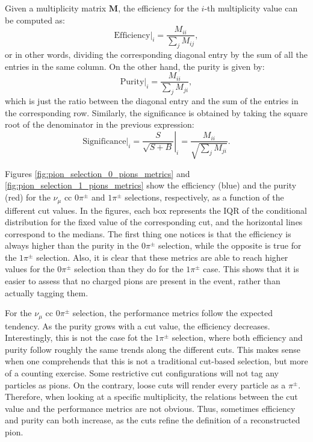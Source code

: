 Given a multiplicity matrix $\mathbf{M}$, the efficiency for the $i$-th multiplicity value can be computed as:
\begin{equation}\label{eq:efficiency_matrix}
    \left.\mathrm{Efficiency}\right|_{i} = \frac{M_{ii}}{\sum_{j} M_{ij}},
\end{equation}
or in other words, dividing the corresponding diagonal entry by the sum of all the entries in the same column. On the other hand, the purity is given by:
\begin{equation}\label{eq:purity_matrix}
    \left.\mathrm{Purity}\right|_{i} = \frac{M_{ii}}{\sum_{j} M_{ji}},
\end{equation}
which is just the ratio between the diagonal entry and the sum of the entries in the corresponding row. Similarly, the significance is obtained by taking the square root of the denominator in the previous expression:
\begin{equation}\label{eq:significance_matrix}
    \left.\mathrm{Significance}\right|_{i} = \left.\frac{S}{\sqrt{S+B}}\right|_{i} = \frac{M_{ii}}{\sqrt{\sum_{j} M_{ji}}}.
\end{equation}

Figures \ref{fig:pion_selection_0_pions_metrics} and \ref{fig:pion_selection_1_pions_metrics} show the efficiency (blue) and the purity (red) for the $\nu_{\mu}$ \gls{cc} $0\pi^{\pm}$ and $1\pi^{\pm}$ selections, respectively, as a function of the different cut values. In the figures, each box represents the IQR of the conditional distribution for the fixed value of the corresponding cut, and the horizontal lines correspond to the medians. The first thing one notices is that the efficiency is always higher than the purity in the $0\pi^{\pm}$ selection, while the opposite is true for the $1\pi^{\pm}$ selection. Also, it is clear that these metrics are able to reach higher values for the $0\pi^{\pm}$ selection than they do for the $1\pi^{\pm}$ case. This shows that it is easier to assess that no charged pions are present in the event, rather than actually tagging them.

For the $\nu_{\mu}$ \gls{cc} $0\pi^{\pm}$ selection, the performance metrics follow the expected tendency. As the purity grows with a cut value, the efficiency decreases. Interestingly, this is not the case fot the $1\pi^{\pm}$ selection, where both efficiency and purity follow roughly the same trends along the different cuts. This makes sense when one comprehends that this is not a traditional cut-based selection, but more of a counting exercise. Some restrictive cut configurations will not tag any particles as pions. On the contrary, loose cuts will render every particle as a $\pi^{\pm}$. Therefore, when looking at a specific multiplicity, the relations between the cut value and the performance metrics are not obvious. Thus, sometimes efficiency and purity can both increase, as the cuts refine the definition of a reconstructed pion.

